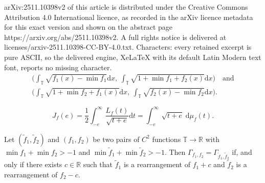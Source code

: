 \documentclass[10pt,a4paper]{amsart}
\newcommand{\R}{\mathbb{R}}
\newcommand{\T}{\mathbb{T}}
\newcommand{\dif}{\mathrm{d}}
\newcommand{\wt}{\widetilde}
\begin{document}
arXiv:2511.10398v2 of this article is distributed under the Creative Commons Attribution 4.0 International licence, as recorded in the arXiv licence metadata for this exact version and shown on the abstract page https://arxiv.org/abs/2511.10398v2. A full rights notice is delivered at licenses/arxiv-2511.10398-CC-BY-4.0.txt. Characters: every retained excerpt is pure ASCII, so the delivered engine, XeLaTeX with its default Latin Modern text font, reports no missing character.
\begin{equation}\label{eq:Gam ends}
\begin{gathered}
    \Big(\int_\T \sqrt{f_1(x) - \min f_1} \dif x,\ \int_\T \sqrt{1 + \min f_1 + f_2(x)} \dif x\Big) \quad \text{and}\\
    \Big(\int_\T \sqrt{1 + \min f_2 + f_1(x)} \dif x,\ \int_\T \sqrt{f_2(x) - \min f_2} \dif x \Big).
\end{gathered}
\end{equation}

\begin{equation}\label{eq:layer-cake J}
	J_f(e) = \frac{1}{2} \int_{-e}^\infty \frac{L_f(t)}{\sqrt{t + e}} \dif t = \int_{-e}^\infty \sqrt{t + e} \;\dif \mu_f(t).
\end{equation}

\begin{lemm}\label{lem:Gam determines f12}
	Let $(\wt f_1, \wt f_2)$ and $(f_1, f_2)$ be two pairs of $C^2$ functions $\T \to \R$ with $\min f_1 + \min f_2 > -1$ and $\min \wt f_1 + \min \wt f_2 > -1$.
	Then $\Gamma_{f_1, f_2} = \Gamma_{\wt f_1, \wt f_2}$ if, and only if there exists $c \in \R$ such that $\wt f_1$ is a rearrangement of $f_1 + c$ and $\wt f_2$ is a rearrangement of $f_2 - c$.
\end{lemm}
\end{document}
